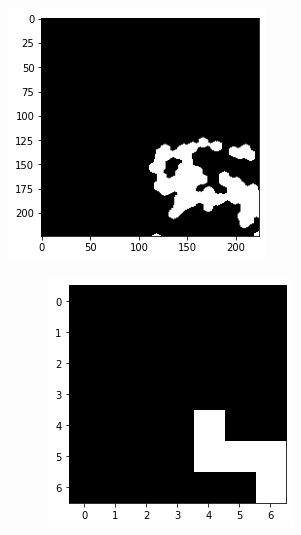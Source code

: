 \documentclass[10pt,twocolumn,hidelinks,letterpaper]{article}
\begin{document}
\begin{figure}[t]
	\centering

	\begin{subfigure}{.4\linewidth}
		\includegraphics[width=\linewidth]{images/mmaps_example/downsampling224x224_bw.png}
	\end{subfigure}
  \begin{subfigure}{.57\linewidth}
    \begin{subfigure}{.32\linewidth}
  		\includegraphics[width=\linewidth]{images/mmaps_example/downsampling7x7_bw.png}

\end{subfigure}
\end{subfigure}
\end{figure}
\end{document}
